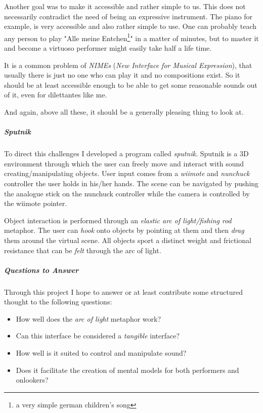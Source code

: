 \documentclass[10pt,a4paper]{scrartcl}
\begin{document}
Another goal was to make it accessible and rather simple to us. This does not necessarily contradict the need of being an expressive instrument. The piano for example, is very accessible and also rather simple to use. One can probably teach any person to play "Alle meine Entchen\footnote{a very simple german children's song}" in a matter of minutes, but to master it and become a virtuoso performer might easily take half a life time.

It is a common problem of \emph{NIMEs} (\emph{New Interface for Musical Expression}), that usually there is just no one who can play it and no compositions exist. \cite{Dobrian2006} So it should be at least accessible enough to be able to get some reasonable sounds out of it, even for dilettantes like me.

And again, above all these, it should be a generally pleasing thing to look at.



\subparagraph{Sputnik}
To direct this challenges I developed a program called \emph{sputnik}. Sputnik is a 3D environment through which the user can freely move and interact with sound creating/manipulating objects. User input comes from a \emph{wiimote} and \emph{nunchuck} controller the user holds in his/her hands. The scene can be navigated by pushing the analogue stick on the nunchuck controller while the camera is controlled by the wiimote pointer.

Object interaction is performed through an \emph{elastic arc of light/fishing rod} metaphor. The user can \emph{hook} onto objects by pointing at them and then \emph{drag} them around the virtual scene. All objects sport a distinct weight and frictional resistance that can be \emph{felt} through the arc of light.


\subparagraph{Questions to Answer}
Through this project I hope to answer or at least contribute some structured thought to the following questions:

\begin{itemize}
\item How well does the \emph{arc of light} metaphor work?
\item Can this interface be considered a \emph{tangible} interface?
\item How well is it suited to control and manipulate sound?
\item Does it facilitate the creation of mental models for both performers and onlookers?
\end{itemize}
\end{document}
